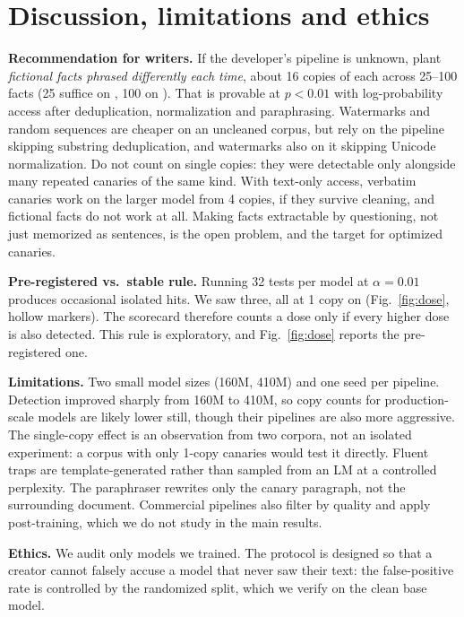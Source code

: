 \section{Discussion, limitations and ethics}
\textbf{Recommendation for writers.} If the developer's pipeline is unknown, plant \emph{fictional facts phrased
differently each time}, about 16 copies of each across 25--100 facts (25 suffice on , 100 on
). That is provable at $p<0.01$ with log-probability access after deduplication, normalization and
paraphrasing. Watermarks and random sequences are cheaper on an uncleaned corpus, but rely on the pipeline skipping
substring deduplication, and watermarks also on it skipping Unicode normalization. Do not count on single copies:
they were detectable only alongside many repeated canaries of the same kind. With text-only access, verbatim
canaries work on the larger model from 4 copies, if they survive cleaning, and fictional facts do not work at
all. Making facts extractable by questioning, not just memorized as sentences, is the open problem, and the target
for optimized canaries.

\textbf{Pre-registered vs.\ stable rule.} Running 32 tests per model at $\alpha=0.01$ produces occasional isolated
hits. We saw three, all at 1 copy on  (Fig.~\ref{fig:dose}, hollow markers). The scorecard therefore counts a dose
only if every higher dose is also detected. This rule is exploratory, and Fig.~\ref{fig:dose} reports the
pre-registered one.

\textbf{Limitations.} Two small model sizes (160M, 410M) and one seed per pipeline. Detection improved sharply from
160M to 410M, so copy counts for production-scale models are likely lower still, though their pipelines are also
more aggressive. The single-copy effect is an observation from two corpora, not an isolated experiment: a corpus with
only 1-copy canaries would test it directly. Fluent traps are template-generated rather than
sampled from an LM at a controlled perplexity. The paraphraser rewrites only the canary paragraph, not the
surrounding document. Commercial pipelines also filter by quality and apply post-training, which we do not study
in the main results.

\textbf{Ethics.} We audit only models we trained. The protocol is designed so that a creator cannot falsely accuse
a model that never saw their text: the false-positive rate is controlled by the randomized split, which we verify
on the clean base model.
